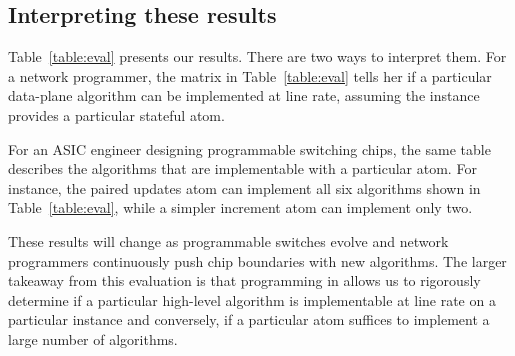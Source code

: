 \subsection{Interpreting these results}
Table~\ref{table:eval} presents our results. There are two ways to interpret
them. For a network programmer, the matrix in Table~\ref{table:eval} tells her
if a particular data-plane algorithm can be implemented at line rate, assuming
the \absmachine instance provides a particular stateful atom.

For an ASIC engineer designing programmable switching chips, the same table
describes the algorithms that are implementable with a particular atom. For
instance, the paired updates atom can implement all six algorithms shown in
Table~\ref{table:eval}, while a simpler increment atom can implement only
two.

These results will change as programmable switches evolve and network
programmers continuously push chip boundaries with new algorithms.  The larger
takeaway from this evaluation is that programming in \pktlanguage allows us to
rigorously determine if a particular high-level algorithm is implementable at
line rate on a particular \absmachine instance and conversely, if a particular
atom suffices to implement a large number of algorithms.

